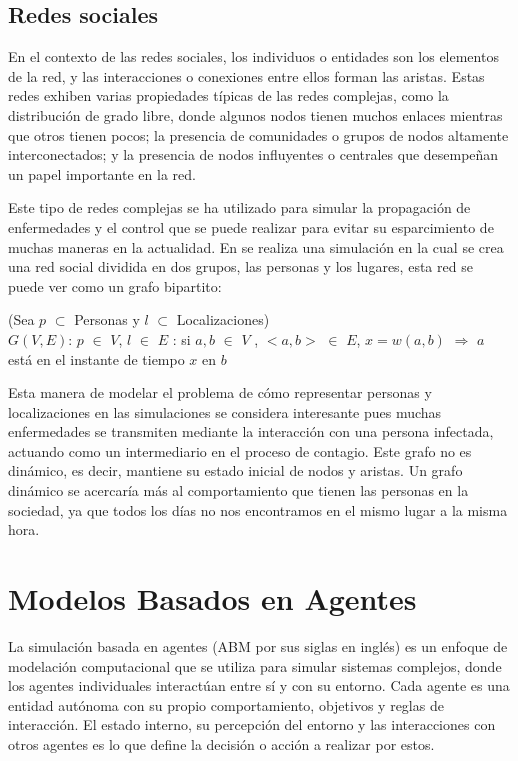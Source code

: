 \subsection{Redes sociales}
En el contexto de las redes sociales, los individuos o entidades son los elementos de la red, 
y las interacciones o conexiones entre ellos forman las aristas. Estas redes exhiben varias propiedades 
típicas de las redes complejas, como la distribución de grado libre, donde algunos nodos tienen 
muchos enlaces mientras que otros tienen pocos; la presencia de comunidades o grupos de nodos altamente 
interconectados; y la presencia de nodos influyentes o centrales que desempeñan un papel importante en la 
red.\autocite{Newman2003}

Este tipo de redes complejas se ha utilizado para simular la propagación de enfermedades y el control que se puede
realizar para evitar su esparcimiento de muchas maneras en la actualidad. En \autocite{Eubank2004} 
se realiza una simulación en la cual se crea una red social dividida en dos grupos, las personas y los lugares, esta red 
se puede ver como un grafo bipartito:
\begin{center}
    (Sea $p$ $\subset$ Personas y $l$ $\subset$ Localizaciones)\\
    $G(V,E)$: $p$ $\in$ $V$, 
$l$ $\in$ $E$ : si $a,b$ $\in$ $V$ , $<a,b>$ $\in$ $E$, $x = w(a,b)$  $\Rightarrow$ $a$ está en el instante de tiempo $x$ en $b$
\end{center} 
Esta manera de modelar el problema de cómo representar personas y localizaciones en las simulaciones se considera 
interesante pues muchas enfermedades se transmiten mediante la interacción con una persona infectada, actuando como un 
intermediario en el proceso de contagio. Este grafo no es dinámico, es decir, mantiene su estado inicial de nodos y aristas.
Un grafo dinámico se acercaría más al comportamiento que tienen las personas en la sociedad, ya que todos los días no nos encontramos
en el mismo lugar a la misma hora.



\section{Modelos Basados en Agentes}
La simulación basada en agentes (ABM por sus siglas en inglés) es un enfoque de modelación computacional que se utiliza para 
simular sistemas complejos, donde los agentes individuales interactúan entre sí y con su entorno. Cada agente es una entidad 
autónoma con su propio comportamiento, objetivos y reglas de interacción. El estado interno,
su percepción del entorno y las interacciones con otros agentes es lo que define la decisión o acción a realizar por
estos. \autocite{Macal2010} \\ 

